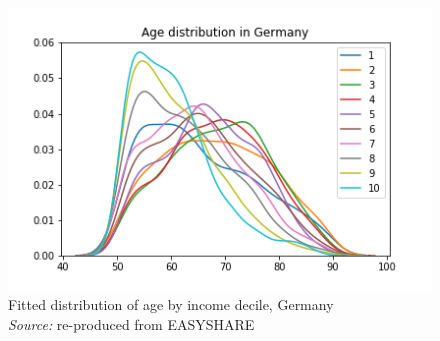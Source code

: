 \begin{figure}[H]
        \centering
        \includegraphics[scale=.5]{images/Age_distribution_in_Germany.png}
            \captionsetup{justification=centering}
    \caption{Fitted distribution of age by income decile, Germany \\ \textit{Source:} re-produced from EASYSHARE}
    \label{fig:age_distr_germany}
\end{figure}



